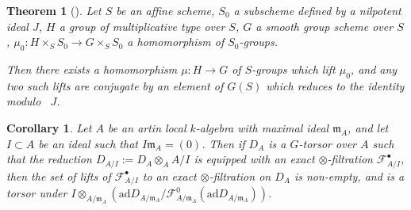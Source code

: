\documentclass{amsart}
\def\ad{\mathrm{ad}}
\newtheorem{theorem}[subsubsection]{Theorem}
\newtheorem{cor}[subsubsection]{Corollary}
\theoremstyle{definition}
\theoremstyle{remark}
\newcommand{\mar}[1]{}
\newcommand{\mar}[1]{\marginpar{\raggedright\tiny squirrel #1}}
\newcommand{\cF}{{\mathcal F}}
\DeclareMathOperator{\Gal}{Gal}
\begin{document}
\begin{theorem}[{\cite[IX.3.6]{SGA3.II}}]\label{thm:lift-cocharacters}
Let $S$ be an affine scheme, $S_0$ a subscheme defined by
a nilpotent ideal $J$, $H$ a group of multiplicative type over $S$, $G$ a smooth group scheme
over $S$, $\mu_0 : H\times_S S_0\rightarrow G\times_S S_0$ a
homomorphism of $S_0$-groups. 

Then there exists a homomorphism $\mu:H\rightarrow G$ of $S$-groups
which lift $\mu_0$, and any two such lifts are conjugate by an
element of $G(S)$ which reduces to the identity modulo~ $J$.
\end{theorem}

\begin{cor}\label{cor:forgetting filtrations is smooth}
Let $A$ be an artin local $k$-algebra with maximal ideal
$\mathfrak{m}_A$, and let $I\subset A$ be an ideal such that
$I\mathfrak{m}_A=(0)$.  Then if $D_A$ is a $G$-torsor over $A$ such
that the reduction $D_{A/I}:=D_A\otimes_AA/I$ is equipped with an
exact $\otimes$-filtration $\mathcal{F}_{A/I}^\bullet$, then the set of
lifts of $\mathcal{F}_{A/I}^\bullet$ to an exact $\otimes$-filtration
on $D_A$ is non-empty, and is a torsor under $I\otimes_{A/\mathfrak{m}_A}(\ad
D_{A/\mathfrak{m}_A}/\mathcal{F}_{A/\mathfrak{m}_A}^0(\ad
D_{A/\mathfrak{m}_A}))$.%
\end{cor}%
\end{document}
